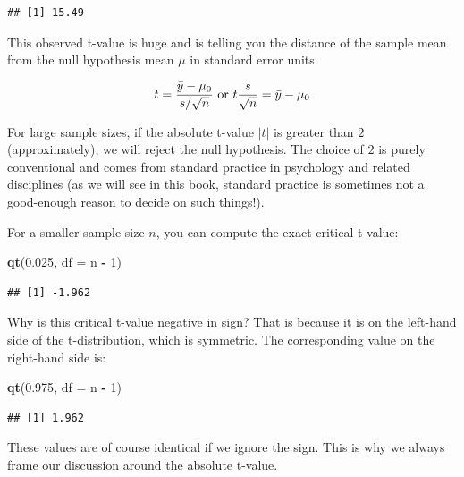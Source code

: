 \documentclass[12pt,]{krantz}
\newenvironment{Shaded}{\begin{snugshade}}{\end{snugshade}}
\newcommand{\DataTypeTok}[1]{\textcolor[rgb]{0.13,0.29,0.53}{#1}}
\newcommand{\DecValTok}[1]{\textcolor[rgb]{0.00,0.00,0.81}{#1}}
\newcommand{\FloatTok}[1]{\textcolor[rgb]{0.00,0.00,0.81}{#1}}
\newcommand{\KeywordTok}[1]{\textcolor[rgb]{0.13,0.29,0.53}{\textbf{#1}}}
\newcommand{\NormalTok}[1]{#1}
\newcommand{\OperatorTok}[1]{\textcolor[rgb]{0.81,0.36,0.00}{\textbf{#1}}}
\newcommand{\StringTok}[1]{\textcolor[rgb]{0.31,0.60,0.02}{#1}}
\begin{document}
\begin{verbatim}
## [1] 15.49
\end{verbatim}

This observed t-value is huge and is telling you the distance of the sample mean from the null hypothesis mean \(\mu\) in standard error units.

\begin{equation}
t=\frac{\bar{y}-\mu_0}{s/\sqrt{n}} \hbox{ or } t\frac{s}{\sqrt{n}}=\bar{y}-\mu_0
\end{equation}

For large sample sizes, if the absolute t-value \(|t|\) is greater than \(2\) (approximately), we will reject the null hypothesis. The choice of \(2\) is purely conventional and comes from standard practice in psychology and related disciplines (as we will see in this book, standard practice is sometimes not a good-enough reason to decide on such things!).

For a smaller sample size \(n\), you can compute the exact critical t-value:

\begin{Shaded}
\begin{Highlighting}[]
\KeywordTok{qt}\NormalTok{(}\FloatTok{0.025}\NormalTok{, }\DataTypeTok{df =}\NormalTok{ n }\OperatorTok{-}\StringTok{ }\DecValTok{1}\NormalTok{)}
\end{Highlighting}
\end{Shaded}

\begin{verbatim}
## [1] -1.962
\end{verbatim}

Why is this critical t-value negative in sign? That is because it is on the left-hand side of the t-distribution, which is symmetric.
The corresponding value on the right-hand side is:

\begin{Shaded}
\begin{Highlighting}[]
\KeywordTok{qt}\NormalTok{(}\FloatTok{0.975}\NormalTok{, }\DataTypeTok{df =}\NormalTok{ n }\OperatorTok{-}\StringTok{ }\DecValTok{1}\NormalTok{)}
\end{Highlighting}
\end{Shaded}

\begin{verbatim}
## [1] 1.962
\end{verbatim}

These values are of course identical if we ignore the sign. This is why we always frame our discussion around the absolute t-value.
\end{document}

